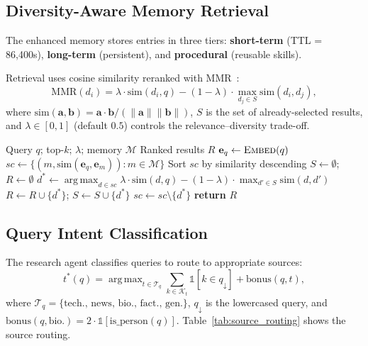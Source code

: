 \documentclass{article}
\theoremstyle{plain}
\theoremstyle{definition}
\newcommand{\algorithmicreturn}{\textbf{return}}
\newcommand{\RETURN}{\STATE \algorithmicreturn{} }
\newcommand{\indicator}{\mathbb{1}}
\DeclareMathOperator*{\argmax}{arg\,max}
\begin{document}
\subsection{Diversity-Aware Memory Retrieval}\label{sec:memory}

The enhanced memory stores entries in three tiers:
\textbf{short-term} (TTL = 86,400s),
\textbf{long-term} (persistent), and
\textbf{procedural} (reusable skills).

Retrieval uses cosine similarity reranked with
MMR~\citep{carbonell1998mmr}:
\begin{equation}\label{eq:mmr}
  \mathrm{MMR}(d_i) = \lambda \!\cdot\! \mathrm{sim}(d_i, q)
  - (1{-}\lambda) \!\cdot\! \max_{d_j \in S} \mathrm{sim}(d_i, d_j),
\end{equation}
where $\mathrm{sim}(\mathbf{a}, \mathbf{b}) = \mathbf{a}{\cdot}\mathbf{b} /
(\|\mathbf{a}\| \|\mathbf{b}\|)$, $S$ is the set of already-selected results,
and $\lambda \in [0, 1]$ (default $0.5$) controls the relevance--diversity
trade-off.

\begin{algorithm}[ht!]
\caption{MMR-Enhanced Semantic Memory Search}
\label{alg:mmr}
\begin{algorithmic}
\REQUIRE Query $q$; top-$k$; $\lambda$; memory $\mathcal{M}$
\ENSURE Ranked results $R$
\STATE $\mathbf{e}_q \leftarrow \textsc{Embed}(q)$
\STATE $\mathit{sc} \leftarrow \{(m, \mathrm{sim}(\mathbf{e}_q, \mathbf{e}_m)) : m \in \mathcal{M}\}$
\STATE Sort $\mathit{sc}$ by similarity descending
\STATE $S \leftarrow \emptyset$; $R \leftarrow \emptyset$
  \STATE $d^* \!\leftarrow\! \argmax_{d \in \mathit{sc}} \lambda \!\cdot\! \mathrm{sim}(d, q) - (1{-}\lambda) \!\cdot\! \max_{d' \in S}\mathrm{sim}(d, d')$
  \STATE $R \leftarrow R \cup \{d^*\}$; $S \leftarrow S \cup \{d^*\}$
  \STATE $\mathit{sc} \leftarrow \mathit{sc} \setminus \{d^*\}$
\ENDWHILE
\RETURN $R$
\end{algorithmic}
\end{algorithm}

\subsection{Query Intent Classification}\label{sec:query_class}

The research agent classifies queries to route to appropriate sources:
\begin{equation}\label{eq:intent}
  t^*(q) = \argmax_{t \in \mathcal{T}_q} \sum_{k \in \mathcal{K}_t}
  \indicator[k \in q_\downarrow] + \mathrm{bonus}(q, t),
\end{equation}
where $\mathcal{T}_q = \{\text{tech., news, bio., fact., gen.}\}$,
$q_\downarrow$ is the lowercased query,
and $\mathrm{bonus}(q, \text{bio.}) = 2 \cdot \indicator[\mathrm{is\_person}(q)]$.
Table~\ref{tab:source_routing} shows the source routing.
\end{document}
